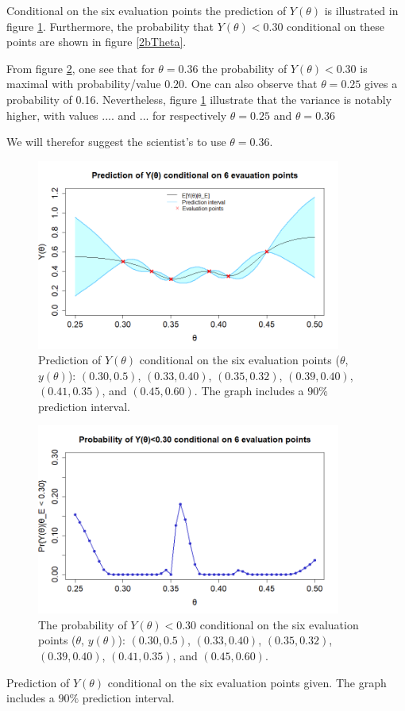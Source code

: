 Conditional on the six evaluation points the prediction of $Y(\theta)$ is illustrated in figure \ref{2cPred}. Furthermore, the probability that $Y(\theta)<0.30$ conditional on these points are shown in figure \ref{2bTheta}. 

From figure \ref{2cTheta}, one see that for $\theta = 0.36$ the probability of $Y(\theta)<0.30$ is maximal with probability/value $0.20$. One can also observe that $\theta = 0.25$ gives a probability of 0.16. Nevertheless, figure \ref{2cPred} illustrate that the variance is notably higher, with values .... and ... for respectively $\theta = 0.25$ and  $\theta = 0.36$

We will therefor suggest the scientist's to use $\theta = 0.36$. 

\begin{figure}
    \centering
    \includegraphics[width=100mm]{2cPred.png}
    \caption{Prediction of $Y(\theta)$ conditional on the six evaluation points  ($\theta$, $y(\theta)$): $(0.30,0.5)$, $(0.33, 0.40)$, $(0.35,0.32)$, $(0.39,0.40)$, $(0.41,0.35)$, and $(0.45,0.60)$. The graph includes a $90\%$ prediction interval. }
    \label{2cPred}
\end{figure}
\begin{figure}
    \centering
    \includegraphics[width=100mm]{2ctheta.png}
    \caption{The probability of $Y(\theta)<0.30$ conditional on the six evaluation points ($\theta$, $y(\theta)$): $(0.30,0.5)$, $(0.33, 0.40)$, $(0.35,0.32)$, $(0.39,0.40)$, $(0.41,0.35)$, and $(0.45,0.60)$.}
    \label{2cTheta}
\end{figure}

Prediction of $Y(\theta)$ conditional on the six evaluation points given. The graph includes a $90\%$ prediction interval. 